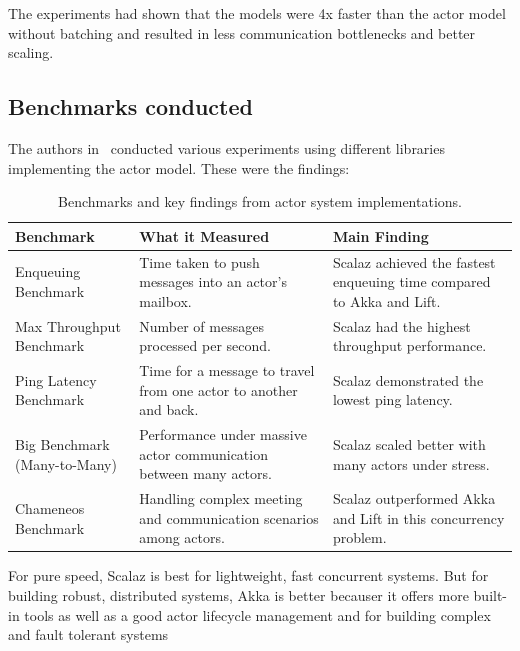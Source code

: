 The experiments had shown that the models were 4x faster than the actor model without batching and resulted in less communication bottlenecks and better scaling.

\subsection{Benchmarks conducted}
The authors in~\cite{8892329} conducted various experiments using different libraries implementing the actor model. These were the findings:

\begin{table}[!htp]
    \centering
    \caption{Benchmarks and key findings from actor system implementations.}
    \label{tab:benchmarks_conducted}
    \begin{tabularx}{\textwidth}{|>{\raggedright\arraybackslash}X|>{\raggedright\arraybackslash}X|>{\raggedright\arraybackslash}X|}
        \hline
        \textbf{Benchmark} & \textbf{What it Measured} & \textbf{Main Finding} \\
        \hline
        Enqueuing Benchmark & Time taken to push messages into an actor's mailbox. & Scalaz achieved the fastest enqueuing time compared to Akka and Lift. \\
        \hline
        Max Throughput Benchmark & Number of messages processed per second. & Scalaz had the highest throughput performance. \\
        \hline
        Ping Latency Benchmark & Time for a message to travel from one actor to another and back. & Scalaz demonstrated the lowest ping latency. \\
        \hline
        Big Benchmark (Many-to-Many) & Performance under massive actor communication between many actors. & Scalaz scaled better with many actors under stress. \\
        \hline
        Chameneos Benchmark & Handling complex meeting and communication scenarios among actors. & Scalaz outperformed Akka and Lift in this concurrency problem. \\
        \hline
    \end{tabularx}
\end{table}

For pure speed, Scalaz is best for lightweight, fast concurrent systems. But for building robust, distributed systems, Akka is better becauser it offers more built-in tools as well as a good actor lifecycle management and for building complex and fault tolerant systems








